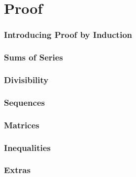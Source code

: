 \documentclass[../maths.tex]{subfiles}
\begin{document}
\chapter{Proof}
\subsection*{Introducing Proof by Induction}
\subsection*{Sums of Series}
\subsection*{Divisibility}
\subsection*{Sequences}
\subsection*{Matrices}
\subsection*{Inequalities}
\subsection*{Extras}
\end{document}
